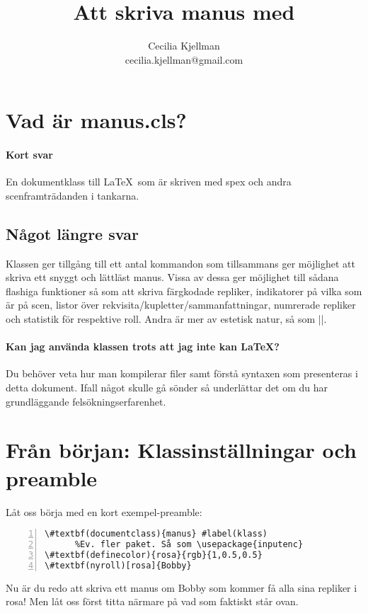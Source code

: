 \documentclass{article}
\title  {Att skriva manus med \pack{manus.cls}}
\author {Cecilia Kjellman \\ cecilia.kjellman@gmail.com}
\date{\todayiso}
\newcommand*{\pack}{\textsf}
\begin{document}
\maketitle



\tableofcontents

\newpage

\section{Vad är \pack{manus.cls}?} %
\paragraph{Kort svar} En dokumentklass till \LaTeX\ som är skriven med spex och andra scenframträdanden i tankarna.
\subsection{Något längre svar}
Klassen ger tillgång till ett antal kommandon som tillsammans ger möjlighet att skriva ett snyggt och lättläst manus. Vissa av dessa ger möjlighet till sådana flashiga funktioner så som att skriva färgkodade repliker, indikatorer på vilka som är på scen, listor över rekvisita/kupletter/sammanfattningar, numrerade repliker och statistik för respektive roll. Andra är mer av estetisk natur, så som |\akt|. 

\paragraph{Kan jag använda klassen trots att jag inte kan \LaTeX?}
Du behöver veta hur man kompilerar filer samt förstå syntaxen som presenteras i detta dokument. Ifall något skulle gå sönder så underlättar det om du har grundläggande felsökningserfarenhet.

\section{Från början: Klassinställningar och preamble} %
Låt oss börja med en kort exempel-preamble:
\begin{Verbatim}[commentchar=!, commandchars=\#\(\),numbers=left,numberblanklines=false]
\#textbf(documentclass){manus} #label(klass)
      %Ev. fler paket. Så som \usepackage{inputenc}
\#textbf(definecolor){rosa}{rgb}{1,0.5,0.5}
\#textbf(nyroll)[rosa]{Bobby}
\end{Verbatim}
Nu är du redo att skriva ett manus om Bobby som kommer få alla sina repliker i rosa! Men låt oss först titta närmare på vad som faktiskt står ovan.
\end{document}
